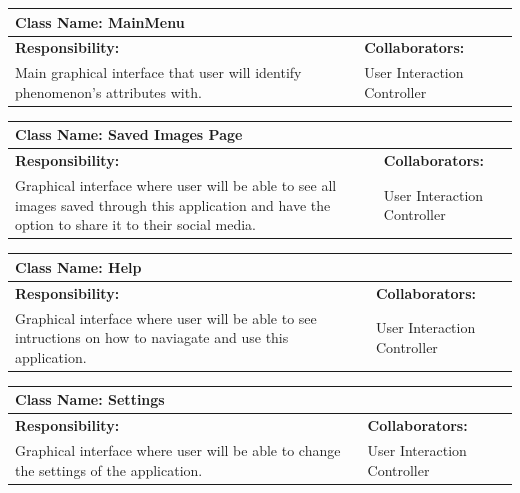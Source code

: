 \documentclass[]{article}
\begin{document}
	\begin{table}[!hb]
		\centering
		\begin{tabular}{|p{5cm}|p{5cm}|}
		\hline 
		 \multicolumn{2}{|l|}{\textbf{Class Name: MainMenu}} \\
		\hline
		\textbf{Responsibility:} & \textbf{Collaborators:} \\
		\hline
		Main graphical interface that user will identify phenomenon's attributes with.  & User Interaction Controller \\
		\hline
		\end{tabular}
	\end{table}

	\begin{table}[!hb]
		\centering
		\begin{tabular}{|p{5cm}|p{5cm}|}
		\hline 
		 \multicolumn{2}{|l|}{\textbf{Class Name: Saved Images Page}} \\
		\hline
		\textbf{Responsibility:} & \textbf{Collaborators:} \\
		\hline
		Graphical interface where user will be able to see all images saved through this application and have the option to share it to their social media. & User Interaction Controller\\
		\hline
		\end{tabular}
	\end{table}

	\begin{table}[!hb]
		\centering
		\begin{tabular}{|p{5cm}|p{5cm}|}
		\hline 
		 \multicolumn{2}{|l|}{\textbf{Class Name: Help}} \\
		\hline
		\textbf{Responsibility:} & \textbf{Collaborators:} \\
		\hline
		Graphical interface where user will be able to see intructions on how to naviagate and use this application.  & User Interaction Controller\\
		\hline
		\end{tabular}
	\end{table}

	\begin{table}[!hb]
		\centering
		\begin{tabular}{|p{5cm}|p{5cm}|}
		\hline 
		 \multicolumn{2}{|l|}{\textbf{Class Name: Settings}} \\
		\hline
		\textbf{Responsibility:} & \textbf{Collaborators:} \\
		\hline
		Graphical interface where user will be able to change the settings of the application.  & User Interaction Controller \\
		\hline
		\end{tabular}
	\end{table}
\end{document}
